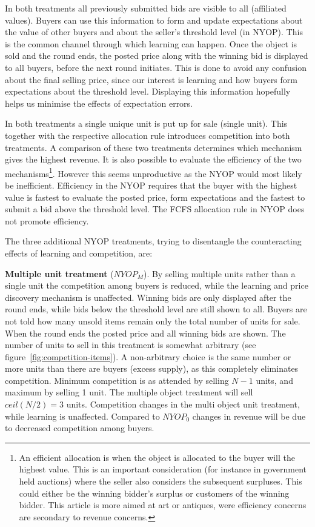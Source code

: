 \documentclass[a4paper,12pt]{article}
\begin{document}
	In both treatments all previously submitted bids are visible to all (affiliated values). Buyers can use this information to form and update expectations about the value of other buyers and about the seller's threshold level (in NYOP). This is the common channel through which learning can happen. Once the object is sold and the round ends, the posted price along with the winning bid is displayed to all buyers, before the next round initiates. This is done to avoid any confusion about the final selling price, since our interest is learning and how buyers form expectations about the threshold level. Displaying this information hopefully helps us minimise the effects of expectation errors.

	In both treatments a single unique unit is put up for sale (single unit). This together with the respective allocation rule introduces competition into both treatments. A comparison of these two treatments determines which mechanism gives the highest revenue. It is also possible to evaluate the efficiency of the two mechanisms\footnote{\label{footnote:efficient}An efficient allocation is when the object is allocated to the buyer will the highest value. This is an important consideration (for instance in government held auctions) where the seller also considers the subsequent surpluses. This could either be the winning bidder's surplus or customers of the winning bidder. This article is more aimed at art or antiques, were efficiency concerns are secondary to revenue concerns.}. However this seems unproductive as the NYOP would most likely be inefficient. Efficiency in the NYOP requires that the buyer with the highest value is fastest to evaluate the posted price, form expectations and the fastest to submit a bid above the threshold level. The FCFS allocation rule in NYOP does not promote efficiency. 

	The three additional NYOP treatments, trying to disentangle the counteracting effects of learning and competition, are:

	{\bf Multiple unit treatment} ($NYOP_M$). 
	By selling multiple units rather than a single unit the competition among buyers is reduced, while the learning and price discovery mechanism is unaffected. Winning bids are only displayed after the round ends, while bids below the threshold level are still shown to all. Buyers are not told how many unsold items remain only the total number of units for sale. When the round ends the posted price and all winning bids are shown. The number of units to sell in this treatment is somewhat arbitrary (see figure~\ref{fig:competition-items}). A non-arbitrary choice is the same number or more units than there are buyers (excess supply), as this completely eliminates competition. Minimum competition is as attended by selling $N-1$ units, and maximum by selling 1 unit. The multiple object treatment will sell $ceil(N/2)=3$ units. Competition changes in the multi object unit treatment, while learning is unaffected. Compared to $NYOP_0$ changes in revenue will be due to decreased competition among buyers.
	
\end{document}
